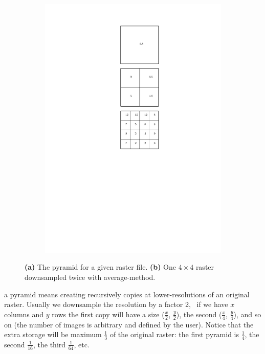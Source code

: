 \begin{figure}
\begin{subfigure}[b]{0.2\linewidth}
    \includegraphics[width=\textwidth]{figs/pyramids2.pdf}
    \caption{}
  \end{subfigure}
\caption{\textbf{(a)} The pyramid for a given raster file. \textbf{(b)} One $4\times4$ raster downsampled twice with average-method.}%
\end{figure}
a pyramid means creating recursively copies at lower-resolutions of an original raster.
Usually we downsample the resolution by a factor 2,%
\ie\ if we have $x$ columns and $y$ rows the first copy will have a size ($\frac{x}{2}$, $\frac{y}{2}$), the second ($\frac{x}{4}$, $\frac{y}{4}$), and so on (the number of images is arbitrary and defined by the user).
Notice that the extra storage will be maximum $\frac{1}{3}$ of the original raster: the first pyramid is $\frac{1}{4}$, the second $\frac{1}{16}$, the third $\frac{1}{64}$, etc.

